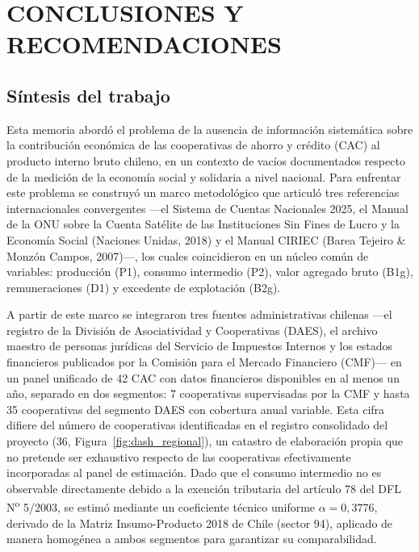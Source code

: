 \chapter{CONCLUSIONES Y RECOMENDACIONES}
\label{ch:conclusion}

\section{Síntesis del trabajo}
\label{sec:sintesis_trabajo}
Esta memoria abordó el problema de la ausencia de información sistemática sobre la contribución económica de las cooperativas de ahorro y crédito (CAC) al producto interno bruto chileno, en un contexto de vacíos documentados respecto de la medición de la economía social y solidaria a nivel nacional. Para enfrentar este problema se construyó un marco metodológico que articuló tres referencias internacionales convergentes —el Sistema de Cuentas Nacionales 2025, el Manual de la ONU sobre la Cuenta Satélite de las Instituciones Sin Fines de Lucro y la Economía Social (Naciones Unidas, 2018) y el Manual CIRIEC (Barea Tejeiro \& Monzón Campos, 2007)—, los cuales coincidieron en un núcleo común de variables: producción (P1), consumo intermedio (P2), valor agregado bruto (B1g), remuneraciones (D1) y excedente de explotación (B2g).

A partir de este marco se integraron tres fuentes administrativas chilenas —el registro de la División de Asociatividad y Cooperativas (DAES), el archivo maestro de personas jurídicas del Servicio de Impuestos Internos y los estados financieros publicados por la Comisión para el Mercado Financiero (CMF)— en un panel unificado de 42 CAC con datos financieros disponibles en al menos un año, separado en dos segmentos: 7 cooperativas supervisadas por la CMF y hasta 35 cooperativas del segmento DAES con cobertura anual variable. Esta cifra difiere del número de cooperativas identificadas en el registro consolidado del proyecto (36, Figura~\ref{fig:dash_regional}), un catastro de elaboración propia que no pretende ser exhaustivo respecto de las cooperativas efectivamente incorporadas al panel de estimación. Dado que el consumo intermedio no es observable directamente debido a la exención tributaria del artículo 78 del DFL N\textsuperscript{o} 5/2003, se estimó mediante un coeficiente técnico uniforme $\alpha = 0{,}3776$, derivado de la Matriz Insumo-Producto 2018 de Chile (sector 94), aplicado de manera homogénea a ambos segmentos para garantizar su comparabilidad.

